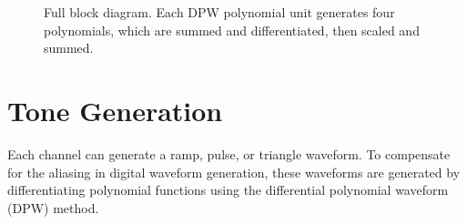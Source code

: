 %
%
%
%
%
%

\begin{figure}[ht]
    \centering
    
    \caption{\label{fig:block-diagram} Full block diagram.  Each DPW polynomial unit generates four polynomials, which are summed and differentiated, then scaled and summed.}
\end{figure}

\section{Tone Generation}

Each channel can generate a ramp, pulse, or triangle waveform.  To compensate for the aliasing in digital waveform generation, these waveforms are generated by differentiating polynomial functions using the differential polynomial waveform (DPW) method\autocite{Valimaki2010}.

